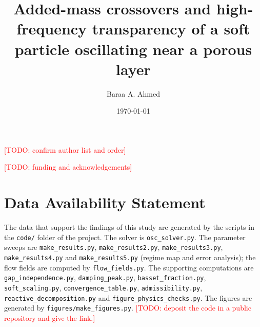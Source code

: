 \documentclass[aip,pof,reprint,amsmath,amssymb,nofootinbib]{revtex4-2}
\newcommand{\TODO}[1]{\textcolor{red}{[TODO: #1]}}
\theoremstyle{plain}
\theoremstyle{definition}
\theoremstyle{remark}
\begin{document}
\title{Added-mass crossovers and high-frequency transparency of a soft particle oscillating near a porous layer}

\author{Baraa A. Ahmed}
\email{\TODO{corresponding e-mail}}
\affiliation{\TODO{affiliation}}
\TODO{confirm author list and order}

\date{\today}

\begin{abstract}

\end{abstract}

\maketitle









\appendix


\begin{acknowledgments}
\TODO{funding and acknowledgements}
\end{acknowledgments}

\section*{Data Availability Statement}
{\sloppy The data that support the findings of this study are generated by the scripts in the \texttt{code/} folder of the
project. The solver is \texttt{osc\_solver.py}. The parameter sweeps are \texttt{make\_results.py},
\texttt{make\_results2.py}, \texttt{make\_results3.py}, \texttt{make\_results4.py} and \texttt{make\_results5.py} (regime map and error analysis); the flow fields are computed by \texttt{flow\_fields.py}. The supporting computations are
\texttt{gap\_independence.py}, \texttt{damping\_peak.py}, \texttt{basset\_fraction.py}, \texttt{soft\_scaling.py},
\texttt{convergence\_table.py}, \texttt{admissibility.py}, \texttt{reactive\_decomposition.py} and
\texttt{figure\_physics\_checks.py}. The figures are generated by \texttt{figures/make\_figures.py}. \TODO{deposit the code
in a public repository and give the link.}\par}


\end{document}
